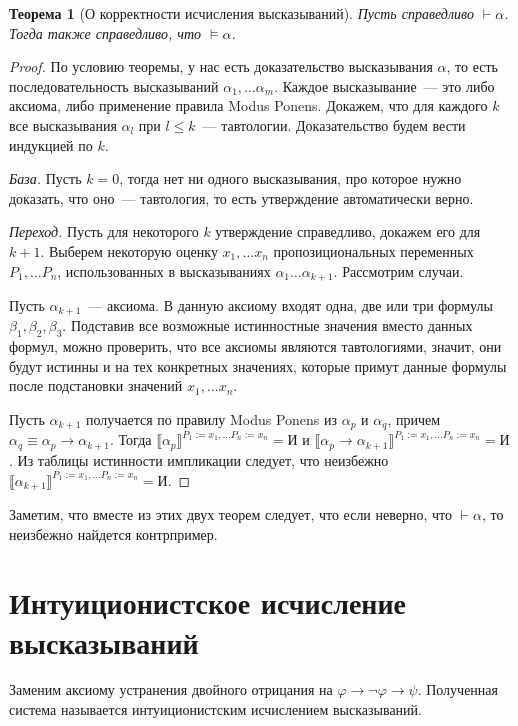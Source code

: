 \documentclass[a4paper,11pt]{article}
\newtheorem{thm}{Теорема}[section]
\theoremstyle{definition}
\newcommand{\sem}[2]{\llbracket #1 \rrbracket^{#2}}
\newcommand{\proves}{\vdash}
\newcommand{\True}{\text{И}}
\begin{document}
\begin{thm}[О корректности исчисления высказываний]
Пусть справедливо $\proves \alpha$. Тогда также справедливо, что $\models
\alpha$.
\end{thm}
\begin{proof}
По условию теоремы, у нас есть доказательство высказывания $\alpha$, то есть
последовательность высказываний $\alpha_1, \dots \alpha_m$. Каждое
высказывание~--- это либо аксиома, либо применение правила Modus Ponens.
Докажем, что для каждого $k$ все высказывания $\alpha_l$ при $l \le k$~---
тавтологии. Доказательство будем вести индукцией по $k$.

\emph{База.} Пусть $k = 0$, тогда нет ни одного высказывания, про которое нужно
доказать, что оно~--- тавтология, то есть утверждение автоматически верно.

\emph{Переход.} Пусть для некоторого $k$ утверждение справедливо, докажем его
для $k+1$. Выберем некоторую оценку $x_1, \dots x_n$ пропозициональных
переменных $P_1, \dots P_n$, использованных в высказываниях $\alpha_1 \dots
\alpha_{k+1}$. Рассмотрим случаи.

Пусть $\alpha_{k+1}$~--- аксиома. В данную аксиому входят одна, две или три
формулы $\beta_1, \beta_2, \beta_3$. Подставив все возможные истинностные
значения вместо данных формул, можно проверить, что все аксиомы являются
тавтологиями, значит, они будут истинны и на тех конкретных значениях, которые
примут данные формулы после подстановки значений $x_1, \dots x_n$.

Пусть $\alpha_{k+1}$ получается по правилу Modus Ponens из $\alpha_p$ и
$\alpha_q$, причем $\alpha_q \equiv \alpha_p \to \alpha_{k+1}$. Тогда
$\sem{\alpha_p}{P_1:=x_1,\dots P_n:=x_n} = \True$ и $\sem{\alpha_p \to
\alpha_{k+1}}{P_1:=x_1,\dots P_n:=x_n} = \True$. Из таблицы истинности
импликации следует, что неизбежно $\sem{\alpha_{k+1}}{P_1:=x_1,\dots
P_n:=x_n} = \True$.
\end{proof}

Заметим, что вместе из этих двух теорем следует, что если неверно, что $\proves
\alpha$, то неизбежно найдется контрпример.

\section{Интуиционистское исчисление высказываний}
Заменим аксиому устранения двойного отрицания на $\varphi \to \neg\varphi \to
\psi$. Полученная система называется интуиционистским исчислением
высказываний.
\end{document}
